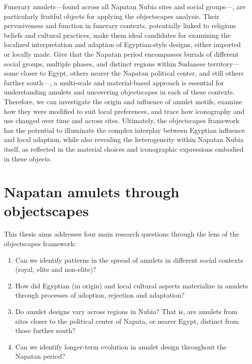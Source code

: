 Funerary amulets---found across all Napatan Nubia sites and social groups---, are particularly fruitful objects for applying the objectscapes analysis. Their pervasiveness and function in funerary contexts, potentially linked to religious beliefs and cultural practices, make them ideal candidates for examining the localized interpretation and adaption of Egyptian-style designs, either imported or locally made. Give that the Napatan period encompasses burials of different social groups, multiple phases, and distinct regions within Sudanese territory---some closer to Egypt, others nearer the Napatan political center, and still others further south---, a multi-scale and material-based approach is essential for understanding amulets and uncovering objectscapes in each of these contexts. Therefore, we can investigate the origin and influence of amulet motifs, examine how they were modified to suit local preferences, and trace how iconography and use changed over time and across sites. Ultimately, the objectscapes framework has the potential to illuminate the complex interplay between Egyptian influence and local adaption, while also revealing the heterogeneity within Napatan Nubia itself, as reflected in the material choices and iconographic expressions embodied in these objects.


\section{Napatan amulets through objectscapes}


This thesis aims addresses four main research questions through the lens of the objectscapes framework:


\begin{enumerate}
	\item Can we identify patterns in the spread of  amulets in different social contexts (royal, elite and non-elite)?
	\item How did Egyptian (in origin) and local cultural aspects materialize in amulets through processes of adoption, rejection and adaptation?
	\item Do amulet designs vary across regions in Nubia? That is, are amulets from sites closer to the political center of Napata, or nearer Egypt, distinct from those further south?
	\item Can we identify longer-term evolution in amulet design throughout the Napatan period?
\end{enumerate}


